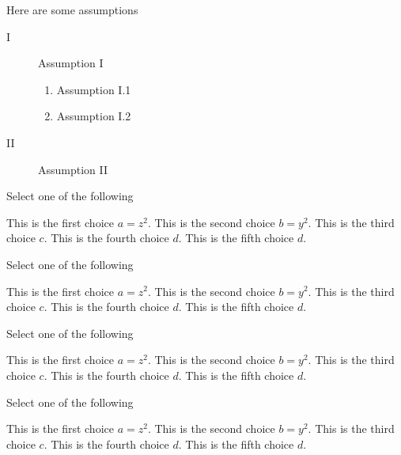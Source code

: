 \begin{gram}[60]
Here are some assumptions
\begin{description}
\item[I] Assumption I
\begin{enumerate}
\item Assumption I.1
\item Assumption I.2
\end{enumerate}

\item[II] Assumption II
\end{description}
\end{gram}


\begin{problem}[70][Pickone I]
Select one of the following
\begin{pickone}
\choice This is the first choice $a = z^2$.
\choice This is the second choice $b = y^2$.
\correctchoice This is the third choice $c$.
\correctchoice This is the fourth choice $d$.
\choice This is the fifth choice $d$.
\end{pickone}
\end{problem}

\begin{problem}[80][Pickone I.2]
Select one of the following
\begin{pickany}
\choice This is the first choice $a = z^2$.
\choice This is the second choice $b = y^2$.
\correctchoice This is the third choice $c$.
\correctchoice This is the fourth choice $d$.
\choice This is the fifth choice $d$.
\end{pickany}
\end{problem}


\begin{problem}[90][Pickone II]
Select one of the following
\begin{pickone}
\choice This is the first choice $a = z^2$.
\choice This is the second choice $b = y^2$.
\correctchoice This is the third choice $c$.
\correctchoice This is the fourth choice $d$.
\choice This is the fifth choice $d$.
\end{pickone}
\end{problem}

\begin{problem}
Select one of the following
\begin{pickone}
\choice This is the first choice $a = z^2$.
\choice This is the second choice $b = y^2$.
\correctchoice This is the third choice $c$.
\correctchoice This is the fourth choice $d$.
\choice This is the fifth choice $d$.
\end{pickone}
\end{problem}


